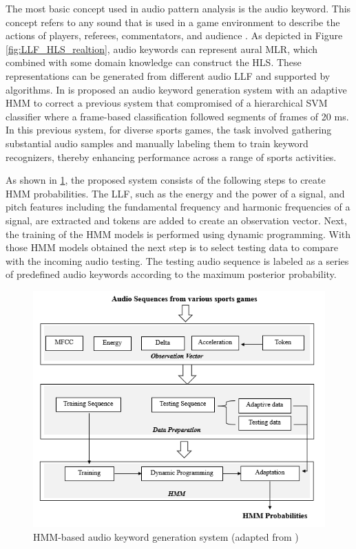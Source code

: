     The most basic concept used in audio pattern analysis is the audio keyword. This concept refers to any sound that is used in a game environment to describe the actions of players, referees, commentators, and audience \cite{AudioKeywordsSoccerVideo}. As depicted in Figure \ref{fig:LLF_HLS_realtion}, audio keywords can represent aural \gls{MLR}, which combined with some domain knowledge can construct the \gls{HLS}. These representations can be generated from different audio \gls{LLF} and supported by algorithms. In \cite{AudioKeywordsSportsAnalysis} is proposed an audio keyword generation system with an adaptive \gls{HMM} to correct a previous system that compromised of a hierarchical \gls{SVM} classifier where a frame-based classification followed segments of frames of 20 ms. In this previous system, for diverse sports games, the task involved gathering substantial audio samples and manually labeling them to train keyword recognizers, thereby enhancing performance across a range of sports activities.

    As shown in \ref{fig:HMM-based_keywordGenerator}, the proposed system consists of the following steps to create \gls{HMM} probabilities. The \gls{LLF}, such as the energy and the power of a signal, and pitch features including the fundamental frequency and harmonic frequencies of a signal, are extracted and tokens are added to create an observation vector. Next, the training of the \gls{HMM} models is performed using dynamic programming. With those \gls{HMM} models obtained the next step is to select testing data to compare with the incoming audio testing. The testing audio sequence is labeled as a series of predefined audio keywords according to the maximum posterior probability.

    \begin{figure}[htbp]
        \centering
        \includegraphics[width=1.0\linewidth]{Chapters/Figures/KeywordsSystemHMM.png}
        \caption{\gls{HMM}-based audio keyword generation system (adapted from \cite{AudioKeywordsSportsAnalysis})}
        \label{fig:HMM-based_keywordGenerator}
    \end{figure}

